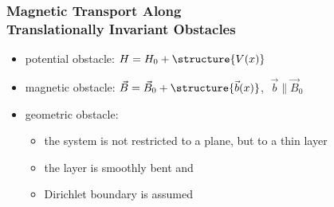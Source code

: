 \documentclass{beamer}
\begin{document}
\begin{frame}
    \frametitle{{\color{gray}Magnetic Transport Along} \\ Translationally Invariant Obstacles}
    \begin{itemize}
        \item potential obstacle: $H = H_0 + \structure{V(x)}$
        \item magnetic obstacle: $\vec B = \vec B_0 + \structure{\vec b(x)}$, $\; \vec b \parallel \vec B_0$
        \item geometric obstacle:
        \begin{itemize}
            \item the system is not restricted to a plane, but to a thin layer
            \item the layer is smoothly bent and 
            \item Dirichlet boundary is assumed
        \end{itemize}
    \end{itemize}
\end{frame}
\end{document}
